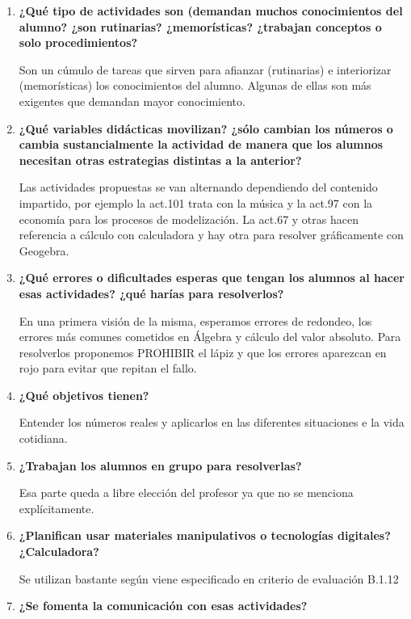 \begin{enumerate}
\item \textbf{¿Qué tipo de actividades son (demandan muchos conocimientos del alumno? ¿son rutinarias? ¿memorísticas? ¿trabajan conceptos o solo procedimientos? }

Son un cúmulo de tareas que sirven para afianzar (rutinarias) e interiorizar (memorísticas) los conocimientos del alumno. Algunas de ellas son más exigentes que demandan mayor conocimiento.

\item \textbf{¿Qué variables didácticas movilizan? ¿sólo cambian los números o cambia sustancialmente la actividad de manera que los alumnos necesitan otras estrategias distintas a la anterior? }

Las actividades propuestas se van alternando dependiendo del contenido impartido, por ejemplo la act.101 trata con la música y la act.97 con la economía para los procesos de modelización. La act.67 y otras hacen referencia a cálculo con calculadora y hay otra para resolver gráficamente con Geogebra.

\item \textbf{¿Qué errores o dificultades esperas que tengan los alumnos al hacer esas actividades? ¿qué harías para resolverlos? }

En una primera visión de la misma, esperamos errores de redondeo, los errores más comunes cometidos en Álgebra y cálculo del valor absoluto.
Para resolverlos proponemos PROHIBIR el lápiz y que los errores aparezcan en rojo para evitar que repitan el fallo.

\item \textbf{¿Qué objetivos tienen? }

Entender los números reales y aplicarlos en las diferentes situaciones e la vida cotidiana.

\item \textbf{¿Trabajan los alumnos en grupo para resolverlas? }

Esa parte queda a libre elección del profesor ya que no se menciona explícitamente.

\item \textbf{¿Planifican usar materiales manipulativos o tecnologías digitales? ¿Calculadora? }

Se utilizan bastante según viene especificado en criterio de evaluación B.1.12

\item \textbf{¿Se fomenta la comunicación con esas actividades? }



\end{enumerate}
